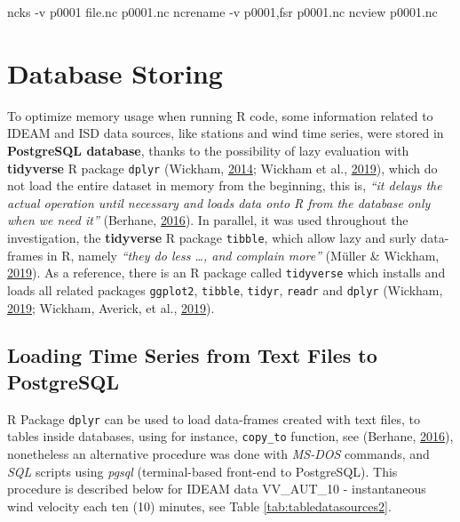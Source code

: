 \documentclass[12pt,oneside]{reedthesis}
\newenvironment{Shaded}{\begin{snugshade}}{\end{snugshade}}
\newcommand{\ExtensionTok}[1]{#1}
\newcommand{\NormalTok}[1]{#1}
\begin{document}
\scriptsize

\vspace{0.4cm}
\begin{Shaded}
\begin{Highlighting}[]
      \ExtensionTok{ncks}\NormalTok{ -v p0001 file.nc p0001.nc}
      \ExtensionTok{ncrename}\NormalTok{ -v p0001,fsr p0001.nc}
      \ExtensionTok{ncview}\NormalTok{ p0001.nc}
\end{Highlighting}
\end{Shaded}
\normalsize

\hypertarget{dbstoring}{%
\chapter{Database Storing}\label{dbstoring}}

To optimize memory usage when running R code, some information related to IDEAM and ISD data sources, like stations and wind time series, were stored in \textbf{PostgreSQL database}, thanks to the possibility of lazy evaluation with \textbf{tidyverse} R package \texttt{dplyr} (Wickham, \protect\hyperlink{ref-Wickham2014}{2014}; Wickham et al., \protect\hyperlink{ref-Wickham2019}{2019}), which do not load the entire dataset in memory from the beginning, this is, \emph{``it delays the actual operation until necessary and loads data onto R from the database only when we need it''} (Berhane, \protect\hyperlink{ref-databasesinr}{2016}). In parallel, it was used throughout the investigation, the \textbf{tidyverse} R package \texttt{tibble}, which allow lazy and surly data-frames in R, namely \emph{``they do less \ldots, and complain more''} (Müller \& Wickham, \protect\hyperlink{ref-Mueller2019}{2019}). As a reference, there is an R package called \texttt{tidyverse} which installs and loads all related packages \texttt{ggplot2}, \texttt{tibble}, \texttt{tidyr}, \texttt{readr} and \texttt{dplyr} (Wickham, \protect\hyperlink{ref-Wickham2019a}{2019}; Wickham, Averick, et al., \protect\hyperlink{ref-Wickham2019b}{2019}).

\hypertarget{loading-time-series-from-text-files-to-postgresql}{%
\section{Loading Time Series from Text Files to PostgreSQL}\label{loading-time-series-from-text-files-to-postgresql}}

R Package \texttt{dplyr} can be used to load data-frames created with text files, to tables inside databases, using for instance, \texttt{copy\_to} function, see (Berhane, \protect\hyperlink{ref-databasesinr}{2016}), nonetheless an alternative procedure was done with \emph{MS-DOS} commands, and \emph{SQL} scripts using \emph{pgsql} (terminal-based front-end to PostgreSQL). This procedure is described below for IDEAM data VV\_AUT\_10 - instantaneous wind velocity each ten (10) minutes, see Table \ref{tab:tabledatasources2}.
\end{document}
